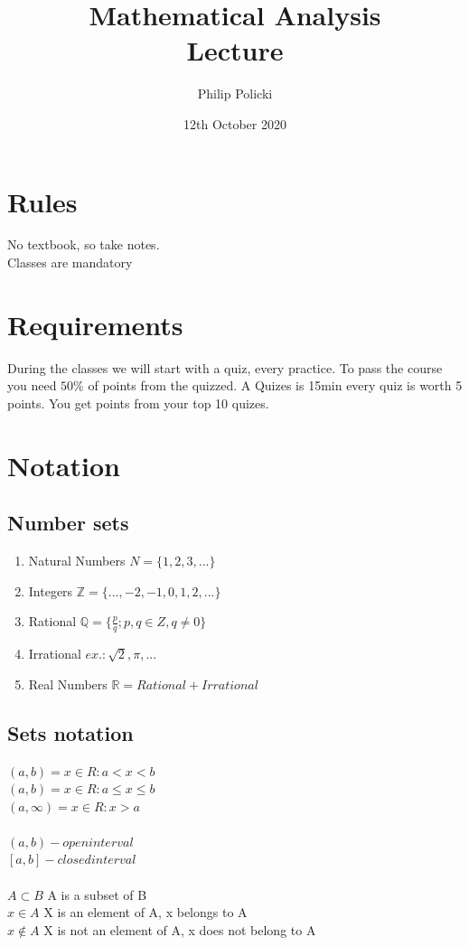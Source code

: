 \documentclass{article}
\title{Mathematical Analysis \\ Lecture }
\author{Philip Policki}
\date{12th October 2020}
\begin{document}
\maketitle
\tableofcontents
\pagebreak
\section{Rules}
	No textbook, so take notes. \\
	Classes are mandatory
	
\section{Requirements}
	During the classes we will start with a quiz, every practice.
	To pass the course you need $50\%$ of points from the quizzed. A Quizes is 15min every quiz is worth 5 points. You get points from your top 10 quizes.
\section{Notation}
\subsection{Number sets}
\begin{enumerate}
	\item Natural Numbers $ N = \{1, 2, 3, ...\}$ 
	\item Integers $ \mathbb{Z} = \{..., -2, -1, 0, 1, 2, ...\}$
	\item Rational $ \mathbb{Q} = \{ \frac{p}{q}; p, q \in Z, q\neq0 \} $
	\item Irrational $ ex.: \sqrt{2}, \pi, ... $ 
	\item Real Numbers $\mathbb{R} = Rational + Irrational $
\end{enumerate}

\subsection{Sets notation}
$(a, b) = x \in R: a<x<b$ \\
$(a, b) = x \in R: a \leq x \leq b$ \\	
$(a, \infty) = x\in R: x > a$ \\ \\
$(a, b) - open interval$ \\
$ [a, b] - closed interval $ \\ \\
$ A \subset B$ A is a subset of B \\
$ x\in A$ X is an element of A, x belongs to A \\
$ x\notin A$ X is not an element of A, x does not belong to A \\
\end{document}
